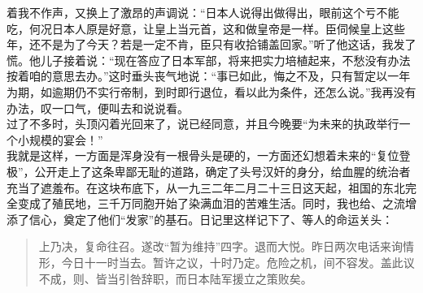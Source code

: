 着我不作声，又换上了激昂的声调说：“日本人说得出做得出，眼前这个亏不能吃，何况日本人原是好意，让皇上当元首，这和做皇帝是一样。臣伺候皇上这些年，还不是为了今天？若是一定不肯，臣只有收拾铺盖回家。”听了他这话，我发了慌。他儿子接着说：“现在答应了日本军部，将来把实力培植起来，不愁没有办法按着咱的意思去办。”这时垂头丧气地说：“事已如此，悔之不及，只有暂定以一年为期，如逾期仍不实行帝制，到时即行退位，看以此为条件，还怎么说。”我再没有办法，叹一口气，便叫去和说说看。\\

过了不多时，头顶闪着光回来了，说已经同意，并且今晚要“为未来的执政举行一个小规模的宴会！”\\

我就是这样，一方面是浑身没有一根骨头是硬的，一方面还幻想着未来的“复位登极”，公开走上了这条卑鄙无耻的道路，确定了头号汉奸的身分，给血腥的统治者充当了遮羞布。在这块布底下，从一九三二年二月二十三日这天起，祖国的东北完全变成了殖民地，三千万同胞开始了染满血泪的苦难生活。同时，我也给、之流增添了信心，奠定了他们“发家”的基石。日记里这样记下了、等人的命运关头：\\

\begin{quote}
	上乃决，复命往召。遂改“暂为维持”四字。退而大悦。昨日两次电话来询情形，今日十一时当去。暂许之议，十时乃定。危险之机，间不容发。盖此议不成，则、皆当引咎辞职，而日本陆军援立之策败矣。\\
\end{quote}
